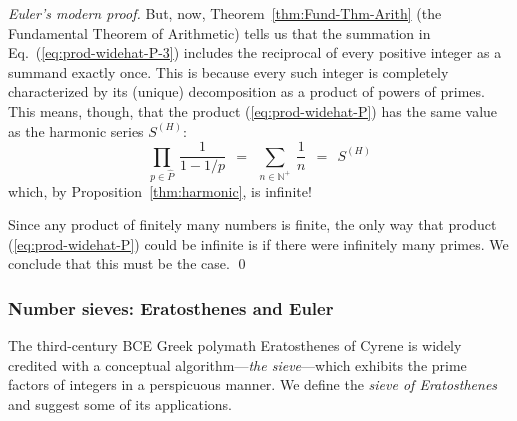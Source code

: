 \begin{proof} [Euler's modern proof]

But, now, Theorem~\ref{thm:Fund-Thm-Arith} (the Fundamental Theorem of Arithmetic) tells us that the summation in Eq.~(\ref{eq:prod-widehat-P-3}) includes the reciprocal of every positive integer as a summand exactly once. This is because every such integer is completely characterized by its (unique) decomposition as a product of powers of primes.  This means, though, that the product (\ref{eq:prod-widehat-P}) has the same value as the harmonic series $S^{(H)}$:
\[ \prod_{p \in \widehat{P}} \ \frac{1}{1-1/p} \ \ = \ \
\sum_{n \in \mathbb{N}^+} \ \frac{1}{n}  \ \ = \ \ S^{(H)} 
\]
which, by Proposition~\ref{thm:harmonic}, is infinite!

\smallskip

Since any product of finitely many numbers is finite, the only way that product 
(\ref{eq:prod-widehat-P}) could be infinite is if there were infinitely many primes.  We conclude that this must be the case.  \qed
\end{proof}


\subsubsection{Number sieves: Eratosthenes and Euler}
\label{sec:sieves}


The third-century BCE Greek polymath Eratosthenes of Cyrene is widely credited with a conceptual algorithm---{\it the sieve}---which exhibits the prime factors of integers in a perspicuous manner.  We define the {\it sieve of Eratosthenes} and suggest some of its applications.

